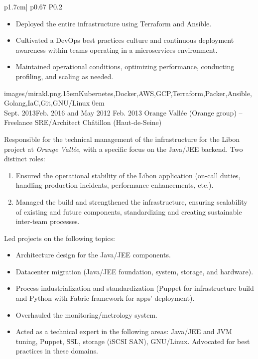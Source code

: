 \begin{longtable}{p{1.7cm}| p{} P{0.2\textwidth}}
{\begin{itemize}
        \item Deployed the entire infrastructure using Terraform and Ansible.
        \item Cultivated a DevOps best practices culture and continuous deployment awareness within teams operating in a microservices environment.
        \item Maintained operational conditions, optimizing performance, conducting profiling, and scaling as needed.
      \end{itemize}
    }
    {images/mirakl.png}{.15em}{Kubernetes,Docker,AWS,GCP,Terraform,Packer,Ansible,Golang,IaC,Git,GNU/Linux}
    {0em} \\
  \cveventdetailed
    {Sept. 2013\newline Feb. 2016 \newline\newline and \newline\newline May 2012 \newline Feb. 2013}
    {Orange Vallée (Orange group) -- Freelance}
    {SRE/Architect}
    {Châtillon (Haut-de-Seine)\color{cvred}}
    {
      Responsible for the technical management of the infrastructure for the Libon project at \emph{Orange Vallée}, with a specific focus on the Java/JEE backend. Two distinct roles:
      \begin{enumerate}
        \item Ensured the operational stability of the Libon application (on-call duties, handling production incidents, performance enhancements, etc.).
        \item Managed the build and strengthened the infrastructure, ensuring scalability of existing and future components, standardizing and creating sustainable inter-team processes.
      \end{enumerate}
      Led projects on the following topics:
      \begin{itemize}
        \item Architecture design for the Java/JEE components.
        \item Datacenter migration (Java/JEE foundation, system, storage, and hardware).
        \item Process industrialization and standardization (Puppet for infrastructure build and Python with Fabric framework for apps' deployment).
        \item Overhauled the monitoring/metrology system.
        \item Acted as a technical expert in the following areas: Java/JEE and JVM tuning, Puppet, SSL, storage (iSCSI SAN), GNU/Linux. Advocated for best practices in these domains.

\end{itemize}}
\end{longtable}
